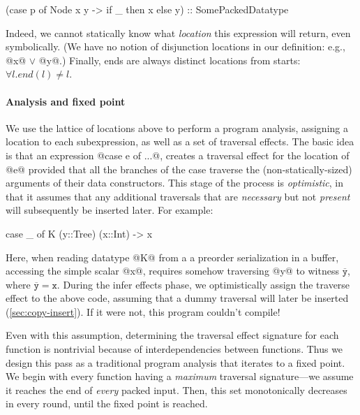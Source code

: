 \documentclass[a4paper,english]{lipics-v2016}
\newcommand{\fixed}[1]{\ensuremath{\texttt{#1}}}
\newcommand{\locend}[1]{\ensuremath{\overline{#1}}}
\begin{document}
\begin{code}
(case p of Node x y -> if _ then x else y) :: SomePackedDatatype
\end{code}

Indeed, we cannot statically know what {\em location} this expression will
return, even symbolically.  (We have no notion of disjunction locations in our
definition: e.g., @x@ $\vee$ @y@.)
Finally, ends are always distinct locations from starts: $\forall l . end(l) \neq l$.




\paragraph*{Analysis and fixed point}

We use the lattice of locations above to perform a program analysis, assigning a
location to each subexpression, as well as a set of traversal effects.  The
basic idea is that an expression @case e of ...@, creates a traversal effect for
the location of @e@ provided that all the branches of the case traverse the
(non-statically-sized) arguments of their data constructors.
%
{This stage of the process is {\em optimistic}, in that it assumes that any
  additional traversals that are {\em necessary} but not {\em present} will
  subsequently be inserted later.  For example:}
\begin{code}
  case _ of K (y::Tree) (x::Int) -> x
\end{code}
%
Here, when reading datatype @K@ from a a preorder serialization in a buffer,
accessing the simple scalar @x@, requires somehow traversing @y@ to witness
\locend{\fixed{y}}, where $\locend{\fixed{y}} = \fixed{x}$.  During the infer
effects phase, we optimistically assign the traverse effect to the above code,
assuming that a dummy traversal will later be inserted (\cref{sec:copy-insert}).
%
If it were not, this program couldn't compile!


Even with this assumption, determining the traversal effect signature for each
function is nontrivial because of interdependencies between functions.
Thus we design this pass as a {traditional program analysis} that iterates
to a fixed point.
%
We begin with every function having a {\em maximum} traversal signature---we
assume it reaches the end of {\em every} packed input. Then, this set
monotonically decreases in every round, until the fixed point is reached.
\end{document}
